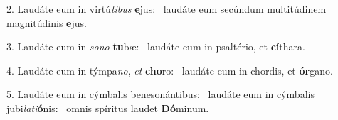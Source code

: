 2. Laudáte eum in virtú\textit{ti}\textit{bus} \textbf{e}jus: \ast\  laudáte eum secúndum multitúdinem magnitúdinis \textbf{e}jus.\

3. Laudáte eum in \textit{so}\textit{no} \textbf{tu}bæ: \ast\  laudáte eum in psaltério, et \textbf{cí}thara.\

4. Laudáte eum in týmpa\textit{no}, \textit{et} \textbf{cho}ro: \ast\  laudáte eum in chordis, et \textbf{ór}gano.\

5. Laudáte eum in cýmbalis benesonántibus: \dag\  laudáte eum in cýmbalis jubi\textit{la}\textit{ti}\textbf{ó}nis: \ast\  omnis spíritus laudet \textbf{Dó}minum.\

